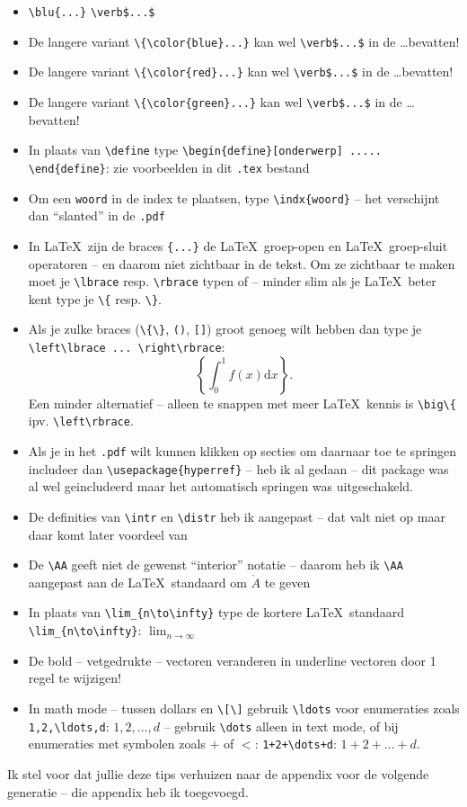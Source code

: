 \documentclass{2wa40summary}
\begin{document}
\begin{itemize}
			\item {} \verb$\blu{...}$  \verb#\verb$...$# 
			\item De langere variant \verb$\{\color{blue}...}$ kan wel \verb#\verb$...$# in de \dots bevatten!
			\item De langere variant \verb$\{\color{red}...}$ kan wel \verb#\verb$...$# in de \dots bevatten!
			\item De langere variant \verb$\{\color{green}...}$ kan wel \verb#\verb$...$# in de \dots bevatten!
			\item In plaats van \verb$\define$ type \verb$\begin{define}[onderwerp] ..... \end{define}$: zie voorbeelden in dit \verb$.tex$ bestand
			\item Om een \verb$woord$ in de index te plaatsen, type \verb$\indx{woord}$ -- het verschijnt dan ``slanted'' in de \verb$.pdf$
			\item In \LaTeX\ zijn de braces \verb${...}$ de \LaTeX\ groep-open en \LaTeX\ groep-sluit operatoren -- en daarom niet zichtbaar in de tekst. Om ze zichtbaar te maken moet je \verb$\lbrace$ resp.{} \verb$\rbrace$ typen of -- minder slim als je \LaTeX\ beter kent type je \verb$\{$ resp.{} \verb$\}$.
			\item Als je zulke braces (\verb$\{\}$, \verb$()$, \verb$[]$) groot genoeg wilt hebben dan type je \verb$\left\lbrace ... \right\rbrace$:
			\[
			\left\lbrace \int_0^1 f(x) \text{d}x \right\rbrace.
			\]
			Een minder alternatief -- alleen te snappen met meer \LaTeX\ kennis is \verb$\big\{$ ipv.{} \verb$\left\rbrace$.
			\item Als je in het \verb$.pdf$ wilt kunnen klikken op secties om daarnaar toe te springen includeer dan
			\verb$\usepackage{hyperref}$ -- heb ik al gedaan -- dit package was al wel geincludeerd maar het automatisch springen was uitgeschakeld.
			\item De definities van \verb$\intr$ en \verb$\distr$ heb ik aangepast -- dat valt niet op maar daar komt later voordeel van
			\item De \verb$\AA$ geeft niet de gewenst ``interior'' notatie -- daarom heb ik \verb$\AA$ aangepast aan de \LaTeX\ standaard
			om $\mathring{A}$ te geven
			\item In plaats van \verb$\lim_{n\to\infty}$ type de kortere \LaTeX\ standaard \verb$\lim_{n\to\infty}$: $\lim_{n\to\infty}$
			\item De bold -- vetgedrukte -- vectoren veranderen in underline vectoren door 1 regel te wijzigen!
			\item In math mode -- tussen dollars en \verb$\[\]$ gebruik \verb$\ldots$ voor enumeraties zoals \verb$1,2,\ldots,d$: $1,2,\ldots,d$ -- gebruik \verb$\dots$ alleen in text mode, of bij enumeraties met symbolen zoals $+$ of $<$: \verb$1+2+\dots+d$: $1+2+\dots+d$. 
		\end{itemize}
		Ik stel voor dat jullie deze tips verhuizen naar de appendix voor de volgende generatie -- die appendix heb ik toegevoegd.
		
\end{document}
